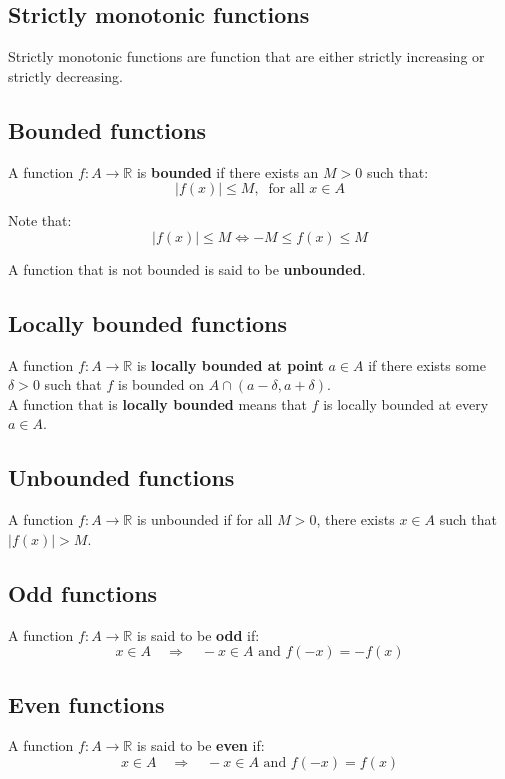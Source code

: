 \documentclass[11pt]{article}
\begin{document}
\subsection{Strictly monotonic functions}
\label{sec:org4d8f4c8}
Strictly monotonic functions are function that are either strictly increasing or strictly decreasing.

\subsection{Bounded functions}
\label{sec:org119d3f2}
A function \(f : A \rightarrow \mathbb{R}\) is \textbf{bounded} if there exists an \(M > 0\) such that:
\[|f(x)| \le M, \ \text{ for all } x \in A\]

Note that:
\[|f(x)| \le M \Leftrightarrow -M \le f(x) \le M\]

A function that is not bounded is said to be \textbf{unbounded}.

\subsection{Locally bounded functions}
\label{sec:org6fc4282}
A function \(f : A \rightarrow \mathbb{R}\) is \textbf{locally bounded at point} \(a \in A\) if there exists some \(\delta > 0\) such that \(f\) is bounded on \(A \cap (a - \delta, a + \delta)\).
\\[0pt]

A function that is \textbf{locally bounded} means that \(f\) is locally bounded at every \(a \in A\).

\subsection{Unbounded functions}
\label{sec:orgaa96f59}
A function \(f : A \rightarrow \mathbb{R}\) is unbounded if for all \(M > 0\), there exists \(x \in A\) such that \(|f(x)| > M\).

\subsection{Odd functions}
\label{sec:orga77cba0}
A function \(f : A \rightarrow \mathbb{R}\) is said to be \textbf{odd} if:
\[x \in A \quad \Rightarrow \quad -x \in A \text{ and } f(-x) = -f(x)\]

\subsection{Even functions}
\label{sec:orgad85394}
A function \(f : A \rightarrow \mathbb{R}\) is said to be \textbf{even} if:
\[x \in A \quad \Rightarrow \quad -x \in A \text{ and } f(-x) = f(x)\]
\end{document}
